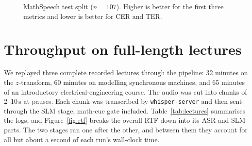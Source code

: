 \documentclass[11pt,a4paper,oneside]{report}
\theoremstyle{definition}
\begin{document}
\begin{figure}[ht]
\centering
{}
\caption{MathSpeech test split ($n=107$). Higher is better for the first three metrics and lower is better for CER and TER.}
\label{fig:accuracy}
\end{figure}

\section{Throughput on full-length lectures}
\label{sec:res-throughput}
We replayed three complete recorded lectures through the pipeline: 32 minutes on the $z$-transform, 60 minutes on modelling synchronous machines, and 65 minutes of an introductory electrical-engineering course. The audio was cut into chunks of 2--10\,s at pauses. Each chunk was transcribed by \texttt{whisper-server} and then sent through the SLM stage, math-cue gate included. Table~\ref{tab:lectures} summarises the logs, and Figure~\ref{fig:rtf} breaks the overall RTF down into its ASR and SLM parts. The two stages ran one after the other, and between them they account for all but about a second of each run's wall-clock time.
\end{document}
